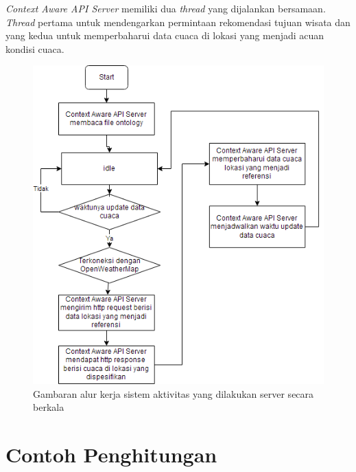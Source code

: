 \textit{Context Aware API Server} memiliki dua \textit{thread} yang dijalankan bersamaan. \textit{Thread} pertama untuk mendengarkan permintaan rekomendasi tujuan wisata dan yang kedua
untuk memperbaharui data cuaca di lokasi yang menjadi acuan kondisi cuaca.
\begin{figure}[h!]
    \centering
    \includegraphics[scale=0.6]{img/flowchart-general-2.png}
    \caption{Gambaran alur kerja sistem aktivitas yang dilakukan server secara berkala}
    \label{fig:flowchart2}
\end{figure}

\section{Contoh Penghitungan}